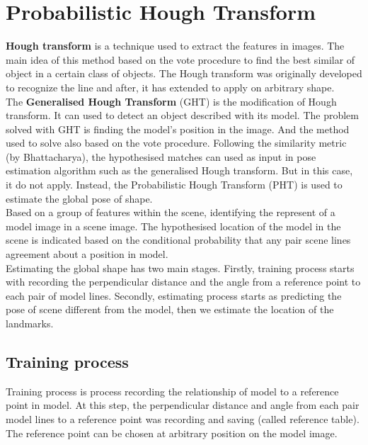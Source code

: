 \section{Probabilistic Hough Transform}
\textbf{Hough transform} is a technique used to extract the features in images. The main idea of this method based on the vote procedure to find the best similar of object in a certain class of objects. The Hough transform was originally developed to recognize the line\cite{hough1962method} and after, it has extended to apply on arbitrary shape\cite{duda1972use}.\\[0.2cm]
The \textbf{Generalised Hough Transform}\cite{ballard1981generalizing} (GHT) is the modification of Hough transform. It can used to detect an object described with its model. The problem solved with GHT is finding the model's position in the image. And the method used to solve also based on the vote procedure. Following the similarity metric (by Bhattacharya), the hypothesised matches can used as input in pose estimation algorithm such as the generalised Hough transform. But in this case, it do not apply. Instead, the Probabilistic Hough Transform (PHT) is used to estimate the global pose of shape\cite{ashbrook1995robust}.\\[0.3cm]
Based on a group of features within the scene, identifying the represent of a model image in a scene image. The hypothesised location of the model in the scene is indicated based on the conditional probability that any pair scene lines agreement about a position in model.\\[0.3cm]
Estimating the global shape has two main stages. Firstly, training process starts with recording the perpendicular distance and the angle from a reference point to each pair of model lines. Secondly, estimating process starts as predicting the pose of scene different from the model, then we estimate the location of the landmarks.
\subsection{Training process}
Training process is process recording the relationship of model to a reference point in model. At this step, the perpendicular distance and angle from each pair model lines to a reference point was recording and saving (called reference table). The reference point can be chosen at arbitrary position on the model image. 
